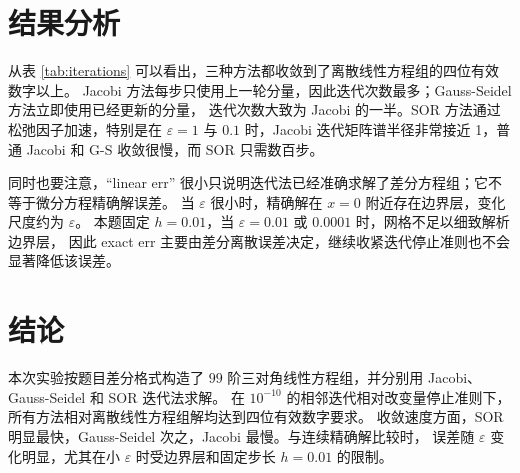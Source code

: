 \documentclass[a4paper,11pt]{article}
\begin{document}
\section{结果分析}
从表 \ref{tab:iterations} 可以看出，三种方法都收敛到了离散线性方程组的四位有效数字以上。
Jacobi 方法每步只使用上一轮分量，因此迭代次数最多；Gauss-Seidel 方法立即使用已经更新的分量，
迭代次数大致为 Jacobi 的一半。SOR 方法通过松弛因子加速，特别是在 $\varepsilon=1$ 与
$0.1$ 时，Jacobi 迭代矩阵谱半径非常接近 1，普通 Jacobi 和 G-S 收敛很慢，而 SOR 只需数百步。

同时也要注意，``linear err'' 很小只说明迭代法已经准确求解了差分方程组；它不等于微分方程精确解误差。
当 $\varepsilon$ 很小时，精确解在 $x=0$ 附近存在边界层，变化尺度约为 $\varepsilon$。
本题固定 $h=0.01$，当 $\varepsilon=0.01$ 或 $0.0001$ 时，网格不足以细致解析边界层，
因此 exact err 主要由差分离散误差决定，继续收紧迭代停止准则也不会显著降低该误差。

\section{结论}
本次实验按题目差分格式构造了 $99$ 阶三对角线性方程组，并分别用 Jacobi、Gauss-Seidel 和 SOR 迭代法求解。
在 $10^{-10}$ 的相邻迭代相对改变量停止准则下，所有方法相对离散线性方程组解均达到四位有效数字要求。
收敛速度方面，SOR 明显最快，Gauss-Seidel 次之，Jacobi 最慢。与连续精确解比较时，
误差随 $\varepsilon$ 变化明显，尤其在小 $\varepsilon$ 时受边界层和固定步长 $h=0.01$ 的限制。
\end{document}
